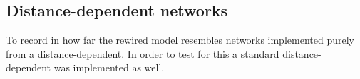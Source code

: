 
\subsection*{Distance-dependent networks}

To record in how far the rewired model resembles networks implemented
purely from a distance-dependent. In order to test for this a standard
distance-dependent was implemented as well.
